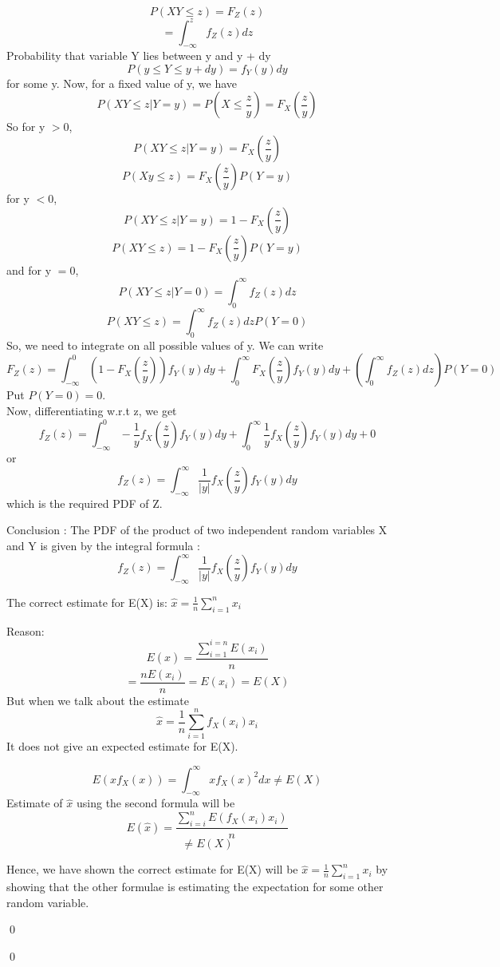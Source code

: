 \documentclass[12pt]{article}
\newenvironment{question}[1]{%
  \vspace{1em}
  \noindent{\Large\bfseries Question #1}\par\vspace{0.5em}
  \itshape
}{\par\vspace{1em}}
\newenvironment{solution}{%
  \vspace{1em}
  \noindent{\Large\bfseries Solution}\par\vspace{0.5em}
  \normalfont
}{\qed\par}
\begin{document}
\begin{solution}
\[P(XY \leq z) = F_Z(z)\]
\[= \int_{-\infty}^{z}  f_Z(z) dz\]
Probability that variable Y lies between y and y + dy
\[P(y \leq Y \leq y + dy) = f_Y(y)dy\]
for some y.
Now, for a fixed value of y, we have
\[P(XY \leq z | Y = y) = P(X \leq \frac{z}{y}) = F_X(\frac{z}{y})\]
So for y $> 0$,
\[P(XY \leq z | Y = y) = F_X(\frac{z}{y})\]
\[P(Xy \leq z) = F_X(\frac{z}{y}) P(Y = y)\]
for y $< 0$,
\[P(XY \leq z | Y = y) = 1 - F_X(\frac{z}{y})\]
\[P(XY \leq z) = 1 - F_X(\frac{z}{y}) P(Y = y)\]
and for y $= 0$,
\[P(XY \leq z | Y = 0) = \int_{0}^{\infty}f_Z(z) dz\]
\[P(XY \leq z) = \int_{0}^{\infty}f_Z(z) dz P(Y = 0)\]
So, we need to integrate on all possible values of y. We can write
\[F_Z(z) = \int_{-\infty}^{0} (1 - F_X(\frac{z}{y})) f_Y(y) dy + \int_{0}^{\infty} F_X(\frac{z}{y}) f_Y(y) dy + (\int_{0}^{\infty}f_Z(z) dz ) P(Y = 0)\]
Put $P(Y = 0) = 0 $.\\Now, differentiating w.r.t z, we get
\[f_Z(z) = \int_{-\infty}^{0} -\frac{1}{y} f_X(\frac{z}{y}) f_Y(y) dy + \int_{0}^{\infty} \frac{1}{y} f_X(\frac{z}{y}) f_Y(y) dy + 0\]
or
\[f_Z(z) = \int_{-\infty}^{\infty} \frac{1}{|y|} f_X(\frac{z}{y}) f_Y(y) dy\]
which is the required PDF of Z.

Conclusion : The PDF of the product of two independent random variables X and Y is given by the integral formula :
\[f_Z(z) = \int_{-\infty}^{\infty} \frac{1}{|y|} f_X(\frac{z}{y}) f_Y(y) dy\]

\begin{question}{3}
\end{question}

\begin{solution}
  The correct estimate for E(X) is: $\hat{x}  =  \frac{1}{n}\sum_{i=1}^{n} x_i$

  Reason:
  \[E(\hat{x}) = \frac{\sum_{i=1}^{i=n} E(x_i)}{n}\]
  \[= \frac{nE(x_i)}{n} = E(x_i) = E(X)\]
  But when we talk about the estimate 
  \[\hat{x} =\frac{1}{n}\sum_{i=1}^{n}f_X(x_i) x_i \]
  It does not give an expected estimate for E(X).

  \[E(xf_X(x)) = \int_{-\infty}^{\infty} x {f_X(x)}^2 dx \neq E(X)\] 
  Estimate of $\hat{x}$ using the second formula will be
  \[E(\hat{x}) = \frac{\sum_{i=i}^{n} E(f_X(x_i)x_i)}{n}\] 
  \[\neq E(X)\]

  Hence, we have shown the correct estimate for E(X) will be $\hat{x}  =  \frac{1}{n}\sum_{i=1}^{n} x_i$
  by showing that the other formulae is estimating the expectation for some other random variable.



\end{solution}
\end{solution}
\end{document}
